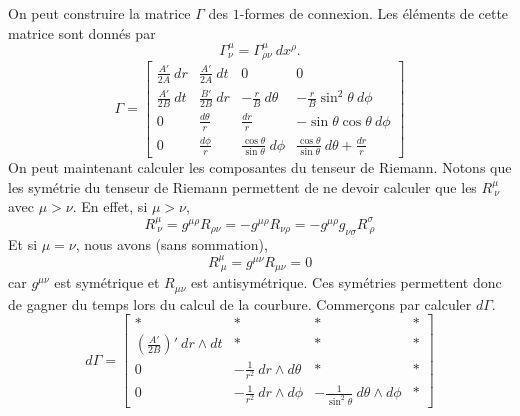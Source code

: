 \documentclass[a4paper,11pt]{report}
\begin{document}
        On peut construire la matrice $\Gamma$ des $1$-formes de connexion. Les éléments de cette matrice sont donnés par 
        \begin{equation}
            \Gamma^\mu_\nu = \Gamma^\mu_{\rho\nu}~dx^\rho.
        \end{equation}
        \begin{equation}
            \Gamma = 
            \begin{bmatrix}
                \frac{A'}{2A}~dr & \frac{A'}{2A}~dt & 0 & 0\\
                \frac{A'}{2B}~dt & \frac{B'}{2B}~dr & -\frac{r}{B}~d\theta & -\frac{r}{B}\sin^2\theta~d\phi \\
                0 & \frac{d\theta}{r} & \frac{dr}{r} & -\sin\theta\cos\theta~d\phi\\
                0 & \frac{d\phi}{r} & \frac{\cos\theta}{\sin\theta}~d\phi & \frac{\cos\theta}{\sin\theta}~d\theta+\frac{dr}{r}
            \end{bmatrix}
        \end{equation}
        On peut maintenant calculer les composantes du tenseur de Riemann. Notons que les symétrie du tenseur de Riemann permettent de ne devoir calculer que les $R^\mu_{~\nu}$ avec $\mu>\nu$. En effet, si $\mu>\nu$,
        \begin{equation}
            R^\mu_{~\nu} = g^{\mu\rho}R_{\rho\nu} = -g^{\mu\rho}R_{\nu\rho} =  -g^{\mu\rho}g_{\nu\sigma}R^\sigma_{~\rho}
        \end{equation}
        Et si $\mu=\nu$, nous avons (sans sommation),
        \begin{equation}
            R^\mu_{~\mu} = g^{\mu\nu}R_{\mu\nu} = 0
        \end{equation}
        car $g^{\mu\nu}$ est symétrique et $R_{\mu\nu}$ est antisymétrique. Ces symétries permettent donc de gagner du temps lors du calcul de la courbure. Commerçons par calculer $d\Gamma$. 
        \begin{equation}
            d\Gamma=
            \begin{bmatrix}
                * & * & * & * \\
                \left( \frac{A'}{2B} \right)'~dr\wedge dt & * & * & * \\
                0 & -\frac{1}{r^2}~dr\wedge d\theta & * & * \\
                0 & -\frac{1}{r^2}~dr\wedge d\phi & -\frac{1}{\sin^2\theta}~d\theta\wedge d\phi & *
            \end{bmatrix}
        \end{equation}
\end{document}
